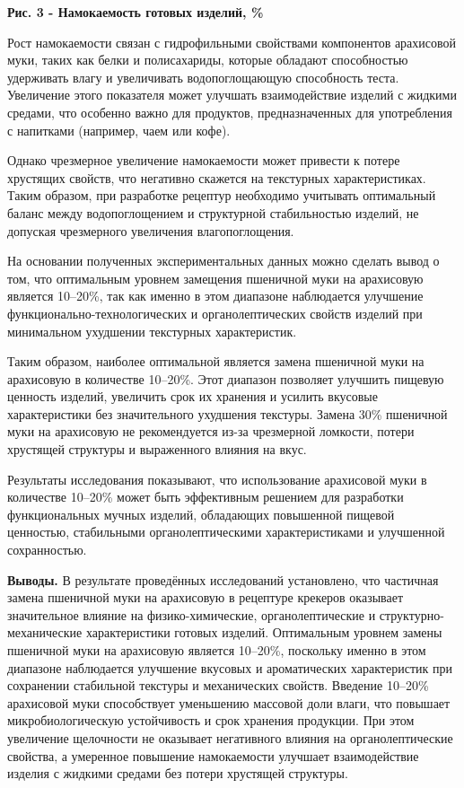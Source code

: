 {\bfseries Рис. 3 - Намокаемость готовых изделий, \%}

\begin{multicols}{2}
Рост намокаемости связан с гидрофильными свойствами компонентов
арахисовой муки, таких как белки и полисахариды, которые обладают
способностью удерживать влагу и увеличивать водопоглощающую способность
теста. Увеличение этого показателя может улучшать взаимодействие изделий
с жидкими средами, что особенно важно для продуктов, предназначенных для
употребления с напитками (например, чаем или кофе).

Однако чрезмерное увеличение намокаемости может привести к потере
хрустящих свойств, что негативно скажется на текстурных характеристиках.
Таким образом, при разработке рецептур необходимо учитывать оптимальный
баланс между водопоглощением и структурной стабильностью изделий, не
допуская чрезмерного увеличения влагопоглощения.

На основании полученных экспериментальных данных можно сделать вывод о
том, что оптимальным уровнем замещения пшеничной муки на арахисовую
является 10--20\%, так как именно в этом диапазоне наблюдается улучшение
функционально-технологических и органолептических свойств изделий при
минимальном ухудшении текстурных характеристик.

Таким образом, наиболее оптимальной является замена пшеничной муки на
арахисовую в количестве 10--20\%. Этот диапазон позволяет улучшить
пищевую ценность изделий, увеличить срок их хранения и усилить вкусовые
характеристики без значительного ухудшения текстуры. Замена 30\%
пшеничной муки на арахисовую не рекомендуется из-за чрезмерной ломкости,
потери хрустящей структуры и выраженного влияния на вкус.

Результаты исследования показывают, что использование арахисовой муки в
количестве 10--20\% может быть эффективным решением для разработки
функциональных мучных изделий, обладающих повышенной пищевой ценностью,
стабильными органолептическими характеристиками и улучшенной
сохранностью.

{\bfseries Выводы.} В результате проведённых исследований установлено, что
частичная замена пшеничной муки на арахисовую в рецептуре крекеров
оказывает значительное влияние на физико-химические, органолептические и
структурно-механические характеристики готовых изделий. Оптимальным
уровнем замены пшеничной муки на арахисовую является 10--20\%, поскольку
именно в этом диапазоне наблюдается улучшение вкусовых и ароматических
характеристик при сохранении стабильной текстуры и механических свойств.
Введение 10--20\% арахисовой муки способствует уменьшению массовой доли
влаги, что повышает микробиологическую устойчивость и срок хранения
продукции. При этом увеличение щелочности не оказывает негативного
влияния на органолептические свойства, а умеренное повышение
намокаемости улучшает взаимодействие изделия с жидкими средами без
потери хрустящей структуры.


\end{multicols}
